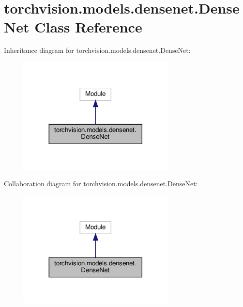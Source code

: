 \hypertarget{classtorchvision_1_1models_1_1densenet_1_1DenseNet}{}\section{torchvision.\+models.\+densenet.\+Dense\+Net Class Reference}
\label{classtorchvision_1_1models_1_1densenet_1_1DenseNet}


Inheritance diagram for torchvision.\+models.\+densenet.\+Dense\+Net\+:
\nopagebreak
\begin{figure}[H]
\begin{center}
\leavevmode
\includegraphics[width=224pt]{classtorchvision_1_1models_1_1densenet_1_1DenseNet__inherit__graph}
\end{center}
\end{figure}


Collaboration diagram for torchvision.\+models.\+densenet.\+Dense\+Net\+:
\nopagebreak
\begin{figure}[H]
\begin{center}
\leavevmode
\includegraphics[width=224pt]{classtorchvision_1_1models_1_1densenet_1_1DenseNet__coll__graph}
\end{center}
\end{figure}
